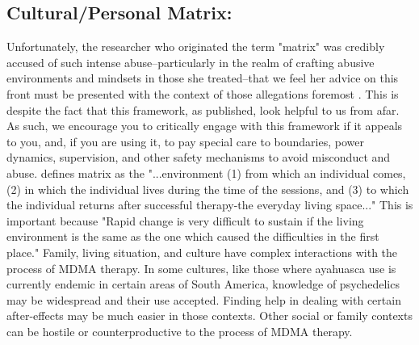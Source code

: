 \documentclass[12pt,letterpaper]{book}
\begin{document}
\subsection{Cultural/Personal Matrix:}
Unfortunately, the researcher who originated the term "matrix" was credibly accused of such intense abuse–particularly in the realm of crafting abusive environments and mindsets in those she treated–that we feel her advice on this front must be presented with the context of those allegations foremost \cite{davidsonEisner}. This is despite the fact that this framework, as published, look helpful to us from afar. As such, we encourage you to critically engage with this framework if it appeals to you, and, if you are using it, to pay special care to boundaries, power dynamics, supervision, and other safety mechanisms to avoid misconduct and abuse. \textcite{setSettingMatrix} defines matrix as the "...environment (1) from which an individual comes, (2) in which the individual lives during the time of the sessions, and (3) to which the individual returns after successful therapy-the everyday living space..." This is important because "Rapid change is very difficult to sustain if the living environment is the same as the one which caused the difficulties in the first place." Family, living situation, and culture have complex interactions with the process of MDMA therapy. In some cultures, like those where ayahuasca use is currently endemic in certain areas of South America, knowledge of psychedelics may be widespread and their use accepted. Finding help in dealing with certain after-effects may be much easier in those contexts. Other social or family contexts can be hostile or counterproductive to the process of MDMA therapy. 
\end{document}
